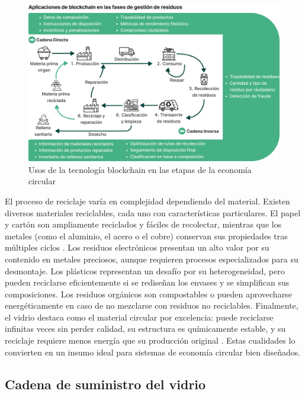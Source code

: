 \begin{figure}[!tb]
    \centering
    \includegraphics[width=\textwidth]{Figures/baralla-model-1.png}
    \caption[Usos de la tecnología \textit{blockchain} en la economía circular]{Usos de la tecnología blockchain en las etapas de la economía circular \cite{baralla2023waste}}
    \label{fig:baralla-model-1}
\end{figure}

El proceso de reciclaje varía en complejidad dependiendo del material. Existen diversos materiales reciclables, cada uno con características particulares. El papel y cartón son ampliamente reciclados y fáciles de recolectar, mientras que los metales (como el aluminio, el acero o el cobre) conservan sus propiedades tras múltiples ciclos \cite{cepal2021economia}. Los residuos electrónicos presentan un alto valor por su contenido en metales preciosos, aunque requieren procesos especializados para su desmontaje. Los plásticos representan un desafío por su heterogeneidad, pero pueden reciclarse eficientemente si se rediseñan los envases y se simplifican sus composiciones. Los residuos orgánicos son compostables o pueden aprovecharse energéticamente en caso de no mezclarse con residuos no reciclables. Finalmente, el vidrio destaca como el material circular por excelencia: puede reciclarse infinitas veces sin perder calidad, su estructura es químicamente estable, y su reciclaje requiere menos energía que su producción original \cite{verallia2022whitebook}. Estas cualidades lo convierten en un insumo ideal para sistemas de economía circular bien diseñados.

\subsection{Cadena de suministro del vidrio}
\label{sec:glass-supply-chain}

